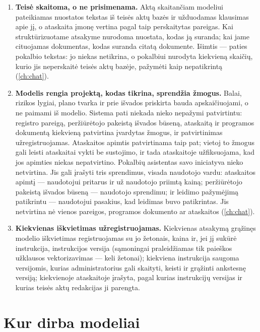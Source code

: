 \begin{enumerate}
  \item \textbf{Teisė skaitoma, o ne prisimenama.} Aktą skaitančiam modeliui pateikiamas
    nuostatos tekstas iš teisės aktų bazės ir užduodamas klausimas apie jį, o ataskaita
    įmonę vertina pagal taip perskaitytas pareigas. Kai struktūrizuotame atsakyme nurodoma
    nuostata, kodas ją suranda; kai jame cituojamas dokumentas, kodas suranda citatą
    dokumente. Išimtis --- paties pokalbio tekstas: jo niekas netikrina, o pokalbiui nurodyta
    kiekvieną skaičių, kurio jis neperskaitė teisės aktų bazėje, pažymėti kaip nepatikrintą
    (\cref{ch:chat}).
  \item \textbf{Modelis rengia projektą, kodas tikrina, sprendžia žmogus.} Balai, rizikos
    lygiai, plano tvarka ir prie išvados priskirta bauda apskaičiuojami, o ne paimami iš
    modelio. Sistema pati niekada nieko nepažymi patvirtintu: registro pareigą, peržiūrėtojo
    pakeistą išvados būseną, ataskaitą ir programos dokumentą kiekvieną
    patvirtina įvardytas žmogus, ir patvirtinimas užregistruojamas. Ataskaitos apimtis
    patvirtinama taip pat; vietoj to žmogus gali leisti ataskaitai vykti be sustojimo, ir
    tada ataskaitoje užfiksuojama, kad jos apimties niekas nepatvirtino. Pokalbių asistentas
    savo iniciatyva nieko netvirtina. Jis gali įrašyti tris sprendimus, visada naudotojo
    vardu: ataskaitos apimtį --- naudotojui pritarus ir už naudotojo priimtą kainą;
    peržiūrėtojo pakeistą išvados būseną --- naudotojo sprendimu; ir leidimo pažymėjimą
    patikrintu --- naudotojui pasakius, kad leidimas buvo patikrintas. Jis netvirtina nė vienos
    pareigos, programos dokumento ar ataskaitos
    (\cref{ch:chat}).
  \item \textbf{Kiekvienas iškvietimas užregistruojamas.} Kiekvienas atsakymą grąžinęs modelio
    iškvietimas registruojamas su jo žetonais, kaina ir, jei jį sukūrė instrukcija,
    instrukcijos versija (sąmoningai praleidžiamas tik paieškos užklausos vektorizavimas ---
    keli žetonai); kiekviena instrukcija saugoma versijomis, kurias administratorius gali
    skaityti, keisti ir grąžinti ankstesnę versiją; kiekvienoje ataskaitoje įrašyta, pagal
    kurias instrukcijų versijas ir kurias teisės aktų redakcijas ji parengta.
\end{enumerate}

\section{Kur dirba modeliai}\label{sec:intro:models}

